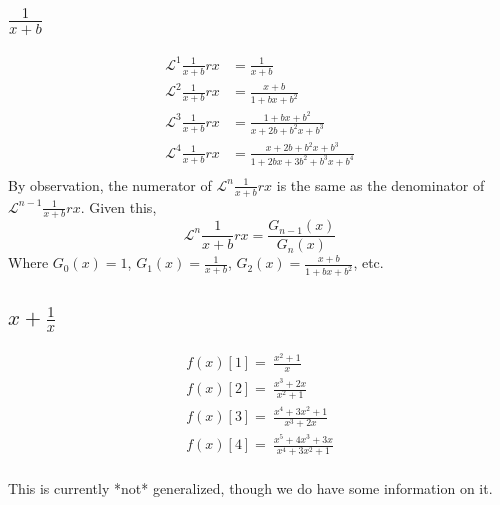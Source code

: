 \documentclass[10pt, letterpaper]{article}
\begin{document}
\subsection{$\frac{1}{x+b}$}
\begin{equation}
    \begin{split}
        \mathscr{L}^1 \frac{1}{x+b} rx & = \frac{1}{x+b}\\
        \mathscr{L}^2 \frac{1}{x+b} rx & = \frac{x+b}{1+bx+b^2}\\
        \mathscr{L}^3 \frac{1}{x+b} rx & = \frac{1+bx+b^2}{x+2b+b^2x+b^3}\\
        \mathscr{L}^4 \frac{1}{x+b} rx & = \frac{x+2b+b^2x+b^3}{1+2bx+3b^2+b^3x+b^4}\\
    \end{split}
\end{equation}
By observation, the numerator of $\mathscr{L}^n \frac{1}{x+b} rx$ is the same as the denominator of $\mathscr{L}^{n-1} \frac{1}{x+b} rx$. Given this,
$$\mathscr{L}^{n} \frac{1}{x+b} rx = \frac{G_{n-1}(x)}{G_n(x)}$$
Where $G_0(x) = 1$, $G_1(x) = \frac{1}{x+b}$, $G_2(x) = \frac{x+b}{1+bx+b^2}$, etc.

\subsection{$x + \frac{1}{x}$}
\begin{equation}
    \begin{split}
        f(x)[1] = \  \frac{x^2+1}{x}\\
        f(x)[2] = \  \frac{x^3+2x}{x^2+1}\\
        f(x)[3] = \  \frac{x^4+3x^2+1}{x^3+2x}\\
        f(x)[4] = \ \frac{x^5+4x^3+3x}{x^4+3x^2+1}\\
    \end{split}
\end{equation}

This is currently *not* generalized, though we do have some information on it.
\end{document}
